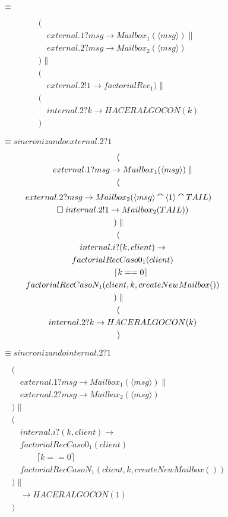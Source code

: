 \documentclass[fleqn]{article}
\newcommand{\myList}[1]{\langle #1 \rangle}
\newcommand{\myCons}[0]{\mathbin{\raise 0.8ex\hbox{$\smallfrown$}}}
\begin{document}
$\qquad \qquad \equiv$

\begin{gather*}
( \\ 
\quad external.1?msg \rightarrow Mailbox_1(\myList{msg}) \parallel \\
\quad external.2?msg \rightarrow Mailbox_2(\myList{msg})  \\
) \parallel \\
( \\
\quad external.2!1 \rightarrow factorialRec_1
) \parallel \\
( \\
\quad internal.2?k \rightarrow HACERALGOCON(k) \\ 
)
\end{gather*}

$\qquad \qquad \equiv sincronizando external.2?1$

\begin{gather*}
( \\ 
\quad external.1?msg \rightarrow Mailbox_1(\myList{msg}) \parallel \\
( \\
external.2?msg \rightarrow Mailbox_2(\myList{msg} \myCons \myList{1} \myCons TAIL) \\ 
\quad \square \; internal.2!1 \rightarrow Mailbox_2(TAIL) ) \\
) \parallel \\
( \\
\quad internal.i?(k,client) \rightarrow \\
\quad factorialRecCaso0_1(client) \\
\quad \qquad \lceil k == 0 \rceil \\
\quad factorialRecCasoN_1(client, k, createNewMailbox()) \\
) \parallel \\
( \\
\quad internal.2?k \rightarrow HACERALGOCON(k) \\ 
)
\end{gather*}

$\qquad \qquad \equiv sincronizando internal.2?1$

\begin{gather*}
( \\ 
\quad external.1?msg \rightarrow Mailbox_1(\myList{msg}) \parallel \\
\quad external.2?msg \rightarrow Mailbox_2(\myList{msg})  \\
) \parallel \\
( \\
\quad internal.i?(k,client) \rightarrow \\
\quad factorialRecCaso0_1(client) \\
\quad \qquad \lceil k == 0 \rceil \\
\quad factorialRecCasoN_1(client, k, createNewMailbox()) \\
) \parallel \\
\quad  \rightarrow HACERALGOCON(1) \\ 
)
\end{gather*}



{}

\end{document}
